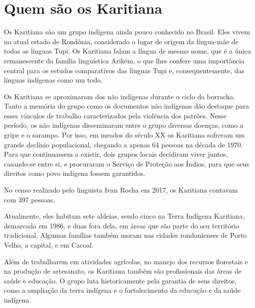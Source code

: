 \chapter{Quem são os Karitiana}

Os Karitiana são um grupo indígena ainda pouco conhecido no Brasil. Eles
vivem no atual estado de Rondônia, considerado o lugar de origem da
língua-mãe de todas as línguas Tupi. Os Karitiana falam a língua de
mesmo nome, que é a única remanescente da família linguística Arikém, o
que lhes confere uma importância central para os estudos comparativos
das línguas Tupi e, consequentemente, das línguas indígenas como um
todo.

Os Karitiana se aproximaram dos não indígenas durante o ciclo da
borracha. Tanto a memória do grupo como os documentos não indígenas dão
destaque para esses vínculos de trabalho caracterizados pela violência
dos patrões. Nesse período, os não indígenas disseminaram entre o grupo
diversas doenças, como a gripe e o sarampo. Por isso, em meados do
século XX os Karitiana sofreram um grande declínio populacional,
chegando a apenas 64 pessoas na década de 1970. Para que continuassem a
existir, dois grupos locais decidiram viver juntos, casando-se entre si,
e procuraram o Serviço de Proteção aos Índios, para que seus direitos
como povo indígena fossem garantidos.

No censo realizado pelo linguista Ivan Rocha em 2017, os Karitiana
contavam com 397 pessoas.

Atualmente, eles habitam sete aldeias, sendo cinco na Terra Indígena
Karitiana, demarcada em 1986, e duas fora dela, em áreas que são parte
do seu território tradicional. Algumas famílias também moram nas cidades
rondonienses de Porto Velho, a capital, e em Cacoal.

Além de trabalharem em atividades agrícolas, no manejo dos recursos
florestais e na produção de artesanato, os Karitiana também são
profissionais das áreas de saúde e educação. O grupo luta historicamente
pela garantia de seus direitos, como a ampliação da terra indígena e o
fortalecimento da educação e da saúde indígena.



